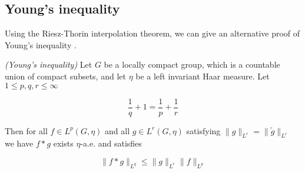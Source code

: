 \subsection{Young's inequality}
Using the Riesz-Thorin interpolation theorem, we can give an alternative proof of Young's inequality \cite[22--23]{grafakos:fourier:2014}.

\vspace{2mm}

\begin{mdframed}
	\begin{theorem}\emph{(Young's inequality)}
		Let $G$ be a locally compact group, which is a countable union of compact subsets, and let $\eta$ be a left invariant Haar measure. Let $1 \leqslant p,q,r \leqslant \infty$

		\begin{equation}
			\frac{1}{q} + 1 = \frac{1}{p} + \frac{1}{r}
		\end{equation}

		Then for all $f \in L^p(G,\eta)$ and all $g \in L^r(G,\eta)$ satisfying $\|g\|_{L^r} = \|\tilde{g}\|_{L^r}$ we have $f \ast g$ exists $\eta$-a.e. and satisfies

		\begin{equation}
			\|f \ast g\|_{L^q} \leqslant \|g\|_{L^r}\|f\|_{L^p}
		\end{equation}
	\end{theorem}
\end{mdframed}

